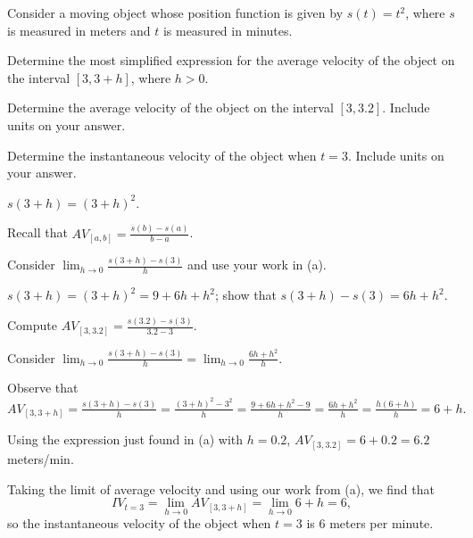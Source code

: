 \begin{activity}  \label{A:1.1.3}
Consider a moving object whose position function is given by $s(t) = t^2$, where $s$ is measured in meters and $t$ is measured in minutes.  
\ba
	\item Determine the most simplified expression for the average velocity of the object on the interval $[3, 3+h]$, where $h > 0$.
	\item Determine the average velocity of the object on the interval $[3,3.2]$.  Include units on your answer.
	\item Determine the instantaneous velocity of the object when $t = 3$.  Include units on your answer.
\ea
\end{activity}
\begin{smallhint}
\ba
	\item $s(3+h) = (3+h)^2$.
	\item Recall that $AV_{[a,b]} = \frac{s(b)-s(a)}{b-a}$.
	\item Consider $\lim_{h \to 0} \frac{s(3+h)-s(3)}{h}$ and use your work in (a).
\ea
\end{smallhint}
\begin{bighint}
\ba
	\item $s(3+h) = (3+h)^2 = 9 + 6h + h^2$; show that $s(3+h) - s(3) = 6h + h^2$.
	\item Compute $AV_{[3,3.2]} = \frac{s(3.2)-s(3)}{3.2-3}$.
	\item Consider $\lim_{h \to 0} \frac{s(3+h)-s(3)}{h} = \lim_{h \to 0} \frac{6h + h^2}{h}$.
\ea
\end{bighint}
\begin{activitySolution}
\ba
	\item Observe that $AV_{[3, 3+h]} =  \frac{s(3+h)-s(3)}{h} = \frac{(3+h)^2 - 3^2}{h} = \frac{9 + 6h + h^2 - 9}{h} = \frac{6h + h^2}{h} = \frac{h(6 + h)}{h} = 6 + h.$
	\item Using the expression just found in (a) with $h = 0.2$, $AV_{[3,3.2]} = 6 + 0.2 = 6.2$ meters/min.
	\item Taking the limit of average velocity and using our work from (a), we find that
	$$IV_{t = 3} = \lim_{h \to 0} AV_{[3, 3+h]} = \lim_{h \to 0} 6+h = 6,$$
	so the instantaneous velocity of the object when $t = 3$ is 6 meters per minute.
\ea
\end{activitySolution}
\aftera
